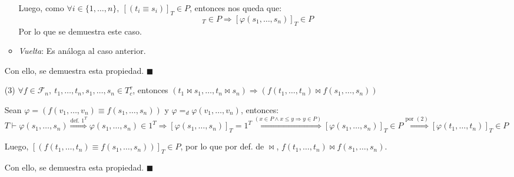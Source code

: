 \documentclass{article}
\begin{document}
\begin{itemize}
\begin{itemize}
                Luego, como $\forall i\in\{1,\dots,n\},\ [(t_i\equiv s_i)]_T\in P$, entonces nos queda que:
                \begin{equation*}
                  [\varphi(t_1,\dots,t_n)]_T\in P\Rightarrow[\varphi(s_1,\dots,s_n)]_T\in P
                \end{equation*}
                Por lo que se demuestra este caso.
          \item \textit{Vuelta}: Es análoga al caso anterior.
        \end{itemize}
        Con ello, se demuestra esta propiedad. $\blacksquare$
  \item[(3)] $\forall f\in\mathcal{F}_n,\ t_1,\dots,t_n,s_1,\dots,s_n\in T^\tau_c$, entonces $(t_1\bowtie s_1,\dots,t_n\bowtie s_n)\Rightarrow(f(t_1,\dots,t_n)\bowtie f(s_1,\dots,s_n))$

        \vspace{0.1cm}
        Sean $\varphi=(f(v_1,\dots,v_n)\equiv f(s_1,\dots,s_n))$ y $\varphi=_d\varphi(v_1,\dots,v_n)$, entonces: $T\vdash\varphi(s_1,\dots,s_n)\overset{\text{def. }1^T}{\Rightarrow}\varphi(s_1,\dots,s_n)\in 1^T\Rightarrow[\varphi(s_1,\dots,s_n)]_T=1^T\overset{(x\in P\land x\leq y\Rightarrow y\in P)}{\Rightarrow}[\varphi(s_1,\dots,s_n)]_T\in P\overset{\text{por }(2)}{\Rightarrow}[\varphi(t_1,\dots,t_n)]_T\in P$

        Luego, $[(f(t_1,\dots,t_n)\equiv f(s_1,\dots,s_n))]_T\in P$, por lo que por def. de $\bowtie$, $f(t_1,\dots,t_n)\bowtie f(s_1,\dots,s_n)$.

        Con ello, se demuestra esta propiedad. $\blacksquare$
\end{itemize}
\end{document}
